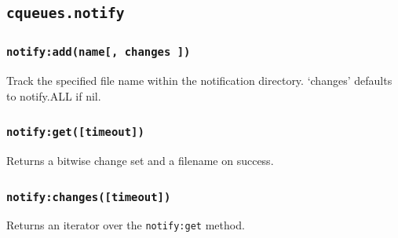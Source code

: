 \documentclass[11pt, oneside]{memoir}
\newcommand*{\fn}[1]{\texttt{#1}\xspace}
\newcommand*{\method}[1]{\texttt{#1}\xspace}
\newcounter{toccols}
\newenvironment{Module}[1]{
	\subsection{\texttt{#1}}
	\addtocontents{toc}{
		\protect\begin{multicols}{\value{toccols}}
	}
}{
	\addtocontents{toc}{\protect\end{multicols}}
}
\begin{document}
\begin{Module}{cqueues.notify}
\subsubsection[\fn{notify:add}]{\fn{notify:add(name[, changes ])}}

Track the specified file name within the notification directory. `changes' defaults to notify.ALL if nil.

\subsubsection[\fn{notify:get}]{\fn{notify:get([timeout])}}

Returns a bitwise change set and a filename on success.

\subsubsection[\fn{notify:changes}]{\fn{notify:changes([timeout])}}

Returns an iterator over the \method{notify:get} method.

\end{Module}
\end{document}
